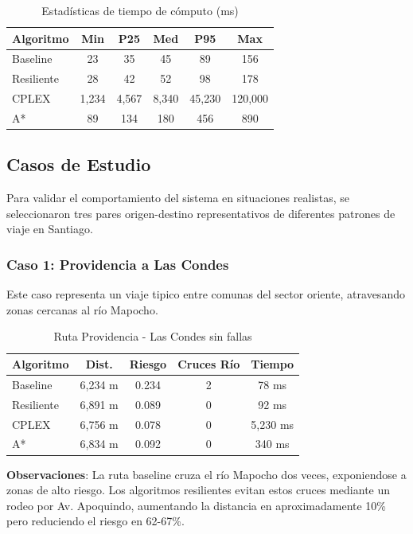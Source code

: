 \documentclass[conference]{IEEEtran}
\begin{document}
\begin{table}[!t]
\centering
\caption{Estadísticas de tiempo de cómputo (ms)}
\begin{tabular}{@{}lccccc@{}}
\toprule
\textbf{Algoritmo} & \textbf{Min} & \textbf{P25} & \textbf{Med} & \textbf{P95} & \textbf{Max} \\
\midrule
Baseline & 23 & 35 & 45 & 89 & 156 \\
Resiliente & 28 & 42 & 52 & 98 & 178 \\
CPLEX & 1,234 & 4,567 & 8,340 & 45,230 & 120,000 \\
A* & 89 & 134 & 180 & 456 & 890 \\
\bottomrule
\end{tabular}
\end{table}

\subsection{Casos de Estudio}

Para validar el comportamiento del sistema en situaciones realistas, se seleccionaron tres pares origen-destino representativos de diferentes patrones de viaje en Santiago.

\subsubsection{Caso 1: Providencia a Las Condes}

Este caso representa un viaje tipico entre comunas del sector oriente, atravesando zonas cercanas al río Mapocho.

\begin{table}[!t]
\centering
\caption{Ruta Providencia - Las Condes sin fallas}
\begin{tabular}{@{}lcccc@{}}
\toprule
\textbf{Algoritmo} & \textbf{Dist.} & \textbf{Riesgo} & \textbf{Cruces Río} & \textbf{Tiempo} \\
\midrule
Baseline & 6,234 m & 0.234 & 2 & 78 ms \\
Resiliente & 6,891 m & 0.089 & 0 & 92 ms \\
CPLEX & 6,756 m & 0.078 & 0 & 5,230 ms \\
A* & 6,834 m & 0.092 & 0 & 340 ms \\
\bottomrule
\end{tabular}
\end{table}

\textbf{Observaciones}: La ruta baseline cruza el río Mapocho dos veces, exponiendose a zonas de alto riesgo. Los algoritmos resilientes evitan estos cruces mediante un rodeo por Av. Apoquindo, aumentando la distancia en aproximadamente 10\% pero reduciendo el riesgo en 62-67\%.
\end{document}
